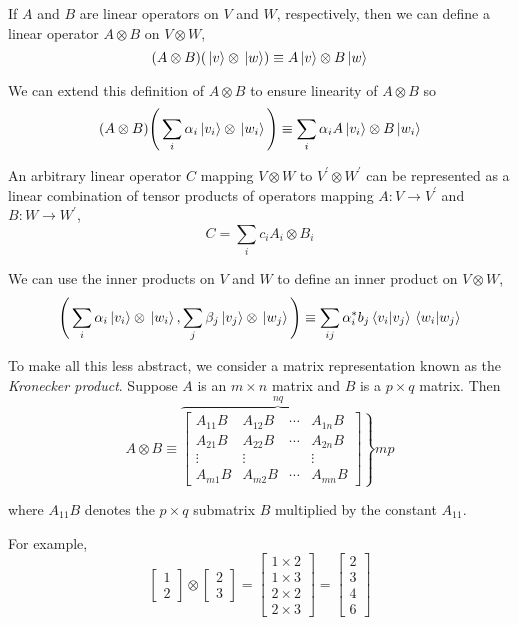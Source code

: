 If $A$ and $B$ are linear operators on $V$ and $W$, respectively, then we can define a linear operator $A \otimes B$ on $V \otimes W$, 
$$(A \otimes B)(\ket*{v} \otimes \ket*{w}) \equiv A\ket*{v} \otimes B\ket*{w}$$

We can extend this definition of $A \otimes B$ to ensure linearity of $A \otimes B$ so 
$$(A \otimes B) \Bigg( \sum_{i} \alpha_{i} \ket*{v_{i}} \otimes \ket*{w_{i}} \Bigg) \equiv \sum_{i} \alpha_{i} A \ket*{v_{i}} \otimes B \ket*{w_{i}}$$

An arbitrary linear operator $C$ mapping $V \otimes W$ to $V^{'} \otimes W^{'}$ can be represented as a linear combination of tensor products of operators mapping $A: V \rightarrow V^{'}$ and $B: W \rightarrow W^{'}$, 
$$C = \sum_{i} c_{i} A_{i} \otimes B_{i}$$

We can use the inner products on $V$ and $W$ to define an inner product on $V \otimes W$, 
$$\Bigg( \sum_{i} \alpha_{i} \ket*{v_{i}} \otimes \ket*{w_{i}} , \sum_{j} \beta_{j} \ket*{v_{j}} \otimes \ket*{w_{j}} \Bigg) \equiv \sum_{ij} \alpha_{i}^{*} b_{j} \bra*{v_{i}}\ket*{v_{j}} \bra*{w_{i}}\ket*{w_{j}}$$

To make all this less abstract, we consider a matrix representation known as the \textit{Kronecker product}. Suppose $A$ is an $m \times n$ matrix and $B$ is a $p \times q$ matrix. Then 
$$A \otimes B \equiv \overbrace{\left.\begin{bmatrix}
A_{11}B & A_{12}B & \cdots & A_{1n}B \\ 
A_{21}B & A_{22}B & \cdots & A_{2n}B \\
\vdots & \vdots & & \vdots \\ 
A_{m1}B & A_{m2}B & \cdots & A_{mn}B
\end{bmatrix} \right\}}^{nq} mp
$$

where $A_{11}B$ denotes the $p \times q$ submatrix $B$ multiplied by the constant $A_{11}$. 

For example, 
$$\begin{bmatrix}
1 \\ 2
\end{bmatrix} \otimes \begin{bmatrix}
2 \\ 3
\end{bmatrix} = \begin{bmatrix}
1 \times 2 \\
1 \times 3 \\
2 \times 2 \\
2 \times 3
\end{bmatrix} = \begin{bmatrix}
2 \\ 
3 \\ 
4 \\ 
6
\end{bmatrix}$$

